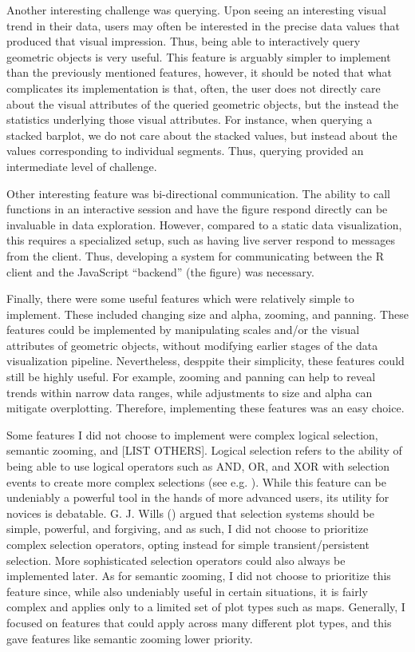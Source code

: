 \documentclass[
]{book}
\theoremstyle{definition}
\theoremstyle{definition}
\theoremstyle{definition}
\theoremstyle{definition}
\theoremstyle{remark}
\begin{document}
Another interesting challenge was querying. Upon seeing an interesting visual trend in their data, users may often be interested in the precise data values that produced that visual impression. Thus, being able to interactively query geometric objects is very useful. This feature is arguably simpler to implement than the previously mentioned features, however, it should be noted that what complicates its implementation is that, often, the user does not directly care about the visual attributes of the queried geometric objects, but the instead the statistics underlying those visual attributes. For instance, when querying a stacked barplot, we do not care about the stacked values, but instead about the values corresponding to individual segments. Thus, querying provided an intermediate level of challenge.

Other interesting feature was bi-directional communication. The ability to call functions in an interactive session and have the figure respond directly can be invaluable in data exploration. However, compared to a static data visualization, this requires a specialized setup, such as having live server respond to messages from the client. Thus, developing a system for communicating between the R client and the JavaScript ``backend'' (the figure) was necessary.

Finally, there were some useful features which were relatively simple to implement. These included changing size and alpha, zooming, and panning. These features could be implemented by manipulating scales and/or the visual attributes of geometric objects, without modifying earlier stages of the data visualization pipeline. Nevertheless, desppite their simplicity, these features could still be highly useful. For example, zooming and panning can help to reveal trends within narrow data ranges, while adjustments to size and alpha can mitigate overplotting. Therefore, implementing these features was an easy choice.

Some features I did not choose to implement were complex logical selection, semantic zooming, and {[}LIST OTHERS{]}. Logical selection refers to the ability of being able to use logical operators such as AND, OR, and XOR with selection events to create more complex selections (see e.g. ). While this feature can be undeniably a powerful tool in the hands of more advanced users, its utility for novices is debatable. G. J. Wills () argued that selection systems should be simple, powerful, and forgiving, and as such, I did not choose to prioritize complex selection operators, opting instead for simple transient/persistent selection. More sophisticated selection operators could also always be implemented later. As for semantic zooming, I did not choose to prioritize this feature since, while also undeniably useful in certain situations, it is fairly complex and applies only to a limited set of plot types such as maps. Generally, I focused on features that could apply across many different plot types, and this gave features like semantic zooming lower priority.
\end{document}
